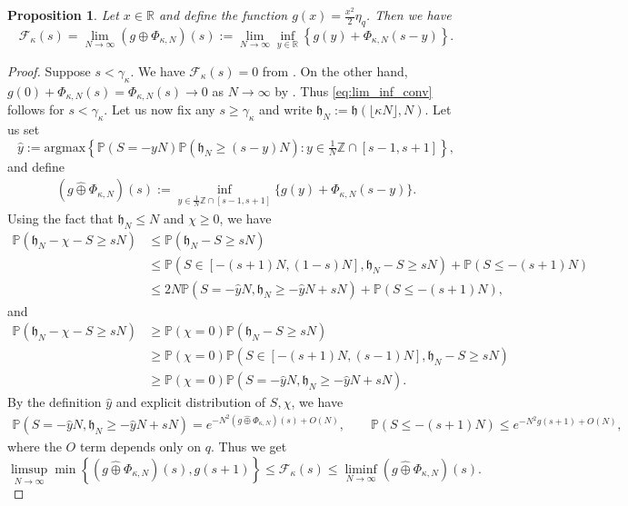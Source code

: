 \documentclass[reqno,11pt]{amsart}
\newcommand{\h}{\mathfrak{h}}
\renewcommand{\Pr}{\mathbb{P}}
\newcommand{\logq}{\eta_q}
\renewcommand{\hat}{\widehat}
\newcommand{\lln}{\gamma_\kappa}
\numberwithin{equation}{section}
\newtheorem{proposition}{Proposition}[section]
\theoremstyle{definition}
\begin{document}
\begin{proposition} \label{prop:f_limit_g+T}
				Let $x \in \mathbb{R}$ and define the function $g(x)=\frac{x^2}{2}\logq$. Then  we have
				\begin{equation}
                \label{eq:lim_inf_conv}
					\mathcal{F}_\kappa(s) = \lim_{N\to \infty}  \left( g \oplus \Phi_{\kappa,N} \right)(s):=\lim_{N\to \infty}\inf_{y \in \mathbb{R}} \left\{ g(y) + \Phi_{\kappa,N}(s-y) \right\}.
				\end{equation}
			\end{proposition}
\begin{proof} Suppose $s< \lln$. We have $\mathcal{F}_\kappa(s)=0$ from . On the other hand, $g(0)+\Phi_{\kappa,N}(s)=\Phi_{\kappa,N}(s) \to 0$ as $N\to \infty$ by . Thus \eqref{eq:lim_inf_conv} follows for $s<\lln$. Let us now fix any $s\ge \lln$ and write $\h_N:=\h(\lfloor\kappa N\rfloor,N)$. Let us set
				\begin{equation*}
					\hat{y} := \mathrm{argmax} \left\{ \mathbb{P}(S = -yN) \mathbb{P}(\h_N \ge (s-y)N) : y\in \tfrac{1}{N} \mathbb{Z}\cap [s-1,s+1] \right\},
				\end{equation*}
  and  define
    \begin{align*}
        (g\hat\oplus\Phi_{\kappa,N})(s):=\inf_{y\in \tfrac{1}{N} \mathbb{Z}\cap [s-1,s+1]} \{g(y)+\Phi_{\kappa,N}(s-y)\}.
    \end{align*} Using the fact that $\h_N\le N$ and $\chi\ge 0$, we have
\begin{align*}
    \Pr(\h_N-\chi-S \ge sN) & \le \Pr(\h_N-S \ge sN) \\ 
& \le \Pr(S\in [-(s+1)N,(1-s)N],\h_N-S\ge sN)+\Pr(S\le -(s+1)N) \\ & \le 2N\Pr(S=-\hat{y}N,\h_N\ge -\hat{y}N+sN)+\Pr(S\le -(s+1)N),
\end{align*}
and
\begin{align*}
    \Pr(\h_N-\chi-S \ge sN) & \ge \Pr(\chi=0)\Pr(\h_N-S \ge sN) \\ 
& \ge \Pr(\chi=0)\Pr(S\in [-(s+1)N,(s-1)N],\h_N-S\ge sN) \\ 
& \ge \Pr(\chi=0)\Pr(S=-\hat{y}N,\h_N\ge -\hat{y}N+sN).
\end{align*}
By the definition $\hat{y}$ and explicit distribution of $S,\chi$, we have
\begin{align*}
    \Pr(S=-\hat{y}N,\h_N\ge -\hat{y}N+sN) = e^{-N^2(g\hat\oplus\Phi_{\kappa,N})(s)+O(N)}, \qquad \Pr(S\le -(s+1)N) \le e^{-N^2g(s+1)+O(N)},
\end{align*}
where the $O$ term depends only on $q$.
Thus we get
\begin{equation}\label{eq:limconv2}
					\limsup_{N\to \infty} \min\left\{ \left( g \hat\oplus \Phi_{\kappa,N} \right)(s), g(s+1) \right\} \le \mathcal{F}_\kappa(s) \le \liminf_{N\to\infty} \left( g \hat\oplus \Phi_{\kappa,N} \right)(s). 
				\end{equation}


\end{proof}
\end{document}

